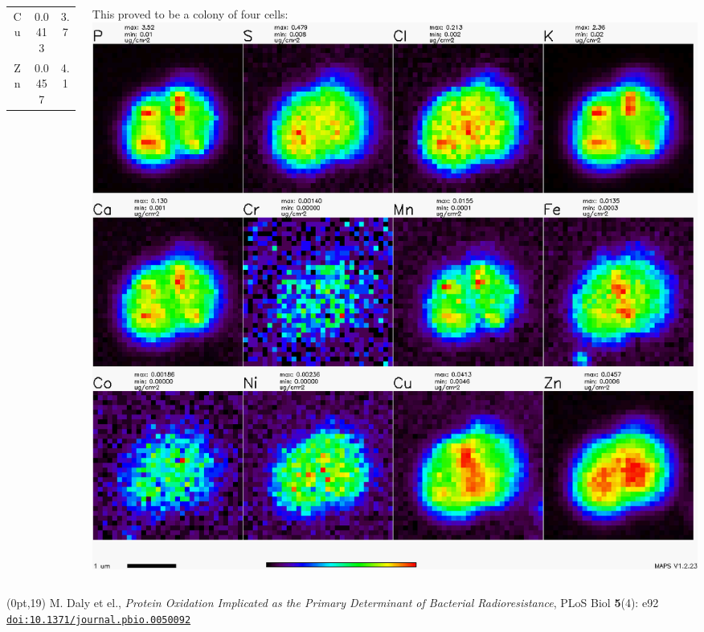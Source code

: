 \begin{frame}
\begin{columns}
\begin{column}{0.4\linewidth}
\begin{center}
{\begin{tabular}{ccc}
            Cu & 0.0413 & 3.7\\
            Zn & 0.0457 & 4.1\\
          \end{tabular}
        }
      \end{center}
    \end{column}
    \begin{column}{0.6\linewidth}
      \begin{center}
        This proved to be a colony of four cells:\\[1ex]
        \includegraphics[width=0.9\linewidth]{xrf/dr_allmaps.png}
      \end{center}
    \end{column}
  \end{columns}

  \bigskip

  \begin{textblock*}{0.5\linewidth}(0pt,19\TPVertModule)
    \tiny M. Daly et el., \textit{Protein Oxidation Implicated as the
      Primary Determinant of Bacterial Radioresistance}, PLoS
    Biol \textbf{5}(4): e92 
    \href{http://dx.doi.org/10.1371/journal.pbio.0050092}
    {\color{Blue4}\texttt{doi:10.1371/journal.pbio.0050092}}
  \end{textblock*}
\end{frame}


